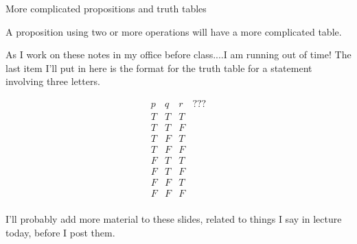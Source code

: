 \documentclass{slides}
\begin{document}
\begin{slide}

{\Large More complicated propositions and truth tables}

A proposition using two or more operations will have a more complicated table.

As I work on these notes in my office before class....I am running out of time!   The last item I'll put in here is the format for the truth table for a statement involving three letters.

$$\begin{array}{ccc|c}

p & q & r & ??? \\ \hline

T & T & T & \\

T & T & F & \\

T & F & T & \\

T & F & F & \\

F & T & T & \\

F & T & F & \\

F & F & T & \\

F & F & F & \\

\end{array}$$

I'll probably add more material to these slides, related to things I say in lecture today, before I post them.



\end{slide}
\end{document}
